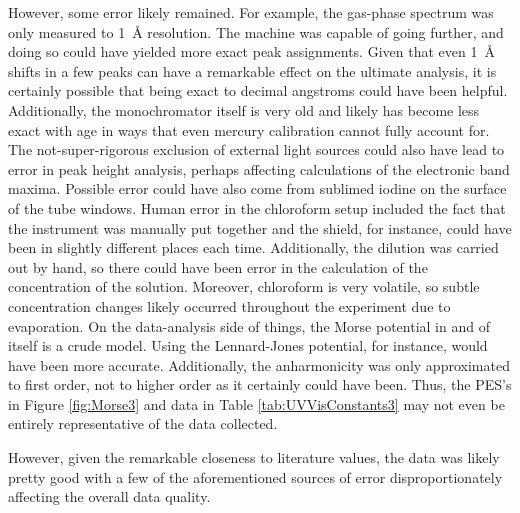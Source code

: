 \documentclass[../labs.tex]{subfiles}
\begin{document}
However, some error likely remained. For example, the gas-phase spectrum was only measured to \SI{1}{\angstrom} resolution. The machine was capable of going further, and doing so could have yielded more exact peak assignments. Given that even \SI{1}{\angstrom} shifts in a few peaks can have a remarkable effect on the ultimate analysis, it is certainly possible that being exact to decimal angstroms could have been helpful. Additionally, the monochromator itself is very old and likely has become less exact with age in ways that even mercury calibration cannot fully account for. The not-super-rigorous exclusion of external light sources could also have lead to error in peak height analysis, perhaps affecting calculations of the electronic band maxima. Possible error could have also come from sublimed iodine on the surface of the tube windows\supercite{bib:McNaughtI2}. Human error in the chloroform setup included the fact that the instrument was manually put together and the shield, for instance, could have been in slightly different places each time. Additionally, the dilution was carried out by hand, so there could have been error in the calculation of the concentration of the solution. Moreover, chloroform is very volatile, so subtle concentration changes likely occurred throughout the experiment due to evaporation. On the data-analysis side of things, the Morse potential in and of itself is a crude model. Using the Lennard-Jones potential, for instance, would have been more accurate. Additionally, the anharmonicity was only approximated to first order, not to higher order as it certainly could have been. Thus, the PES's in Figure \ref{fig:Morse3} and data in Table \ref{tab:UVVisConstants3} may not even be entirely representative of the data collected.\par
However, given the remarkable closeness to literature values, the data was likely pretty good with a few of the aforementioned sources of error disproportionately affecting the overall data quality.
\end{document}
